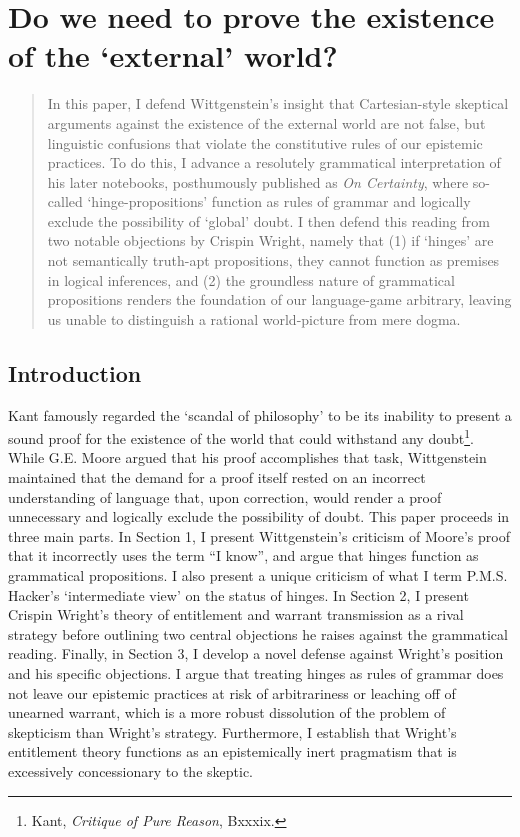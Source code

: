 \chapter{Do we need to prove the existence of the `external' world?}

\renewcommand*{\thesection}{\arabic{section}.}
\renewcommand*{\thesubsection}{\arabic{section}.\arabic{subsection}.}

\begin{quote}
    In this paper, I defend Wittgenstein's insight that Cartesian-style
skeptical arguments against the existence of the external world are not
false, but linguistic confusions that violate the constitutive rules of
our epistemic practices. To do this, I advance a resolutely grammatical
interpretation of his later notebooks, posthumously published as
\emph{On Certainty}, where so-called `hinge-propositions' function as
rules of grammar and logically exclude the possibility of `global'
doubt. I then defend this reading from two notable objections by Crispin
Wright, namely that (1) if `hinges' are not semantically truth-apt
propositions, they cannot function as premises in logical inferences,
and (2) the groundless nature of grammatical propositions renders the
foundation of our language-game arbitrary, leaving us unable to
distinguish a rational world-picture from mere dogma.
\end{quote}

\section*{Introduction}

Kant famously regarded the `scandal of philosophy' to be its inability
to present a sound proof for the existence of the world that could
withstand any doubt\footnote{Kant, \emph{Critique of Pure Reason},
  Bxxxix.}. While G.E. Moore argued that his proof accomplishes that
task, Wittgenstein maintained that the demand for a proof itself rested
on an incorrect understanding of language that, upon correction, would
render a proof unnecessary and logically exclude the possibility of
doubt. This paper proceeds in three main parts. In Section 1, I present
Wittgenstein's criticism of Moore's proof that it incorrectly uses the
term ``I know'', and argue that hinges function as grammatical
propositions. I also present a unique criticism of what I term P.M.S.
Hacker's `intermediate view' on the status of hinges. In Section 2, I
present Crispin Wright's theory of entitlement and warrant transmission
as a rival strategy before outlining two central objections he raises
against the grammatical reading. Finally, in Section 3, I develop a
novel defense against Wright's position and his specific objections. I
argue that treating hinges as rules of grammar does not leave our
epistemic practices at risk of arbitrariness or leaching off of unearned
warrant, which is a more robust dissolution of the problem of skepticism
than Wright's strategy. Furthermore, I establish that Wright's
entitlement theory functions as an epistemically inert pragmatism that
is excessively concessionary to the skeptic.

